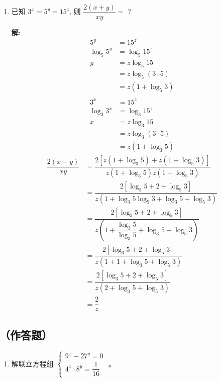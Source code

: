 \documentclass{report}
\newcommand{\sol}{\vspace{0.2cm}\textbf{解}:}
\begin{document}
\begin{multicols*}{2}
\begin{enumerate}
        \item 已知 $3^x=5^y=15^z$, 则 $\dfrac{2(x+y)}{x y}=$ ?

              \sol{}
              \begin{align*}
                  5^y        & = 15^z                 \\
                  \log_5 5^y & = \log_5 15^z          \\
                  y          & = z \log_5 15          \\
                             & = z \log_5 (3 \cdot 5) \\
                             & = z (1 + \log_5 3)     \\
              \end{align*}
              \begin{align*}
                  3^x        & = 15^z                 \\
                  \log_3 3^x & = \log_3 15^z          \\
                  x          & = z \log_3 15          \\
                             & = z \log_3 (3 \cdot 5) \\
                             & = z (1 + \log_3 5)
              \end{align*}
              \begin{align*}
                  \dfrac{2(x+y)}{xy} & = \dfrac{2\left[z(1 + \log_3 5) + z(1 + \log_5 3)\right]}{z(1 + \log_3 5)z(1 + \log_5 3)}                \\
                                     & = \dfrac{2\left[\log_3 5 + 2 + \log_5 3\right]}{z(1 + \log_3 5\log_5 3 + \log_3 5 + \log_5 3)}           \\
                                     & = \dfrac{2\left[\log_3 5 + 2 + \log_5 3\right]}{z(1 + \dfrac{\log_3 5}{\log_3 5} + \log_3 5 + \log_5 3)} \\
                                     & = \dfrac{2\left[\log_3 5 + 2 + \log_5 3\right]}{z(1 + 1 + \log_3 5 + \log_5 3)}                          \\
                                     & = \dfrac{2\left[\log_3 5 + 2 + \log_5 3\right]}{z(2 + \log_3 5 + \log_5 3)}                              \\
                                     & = \dfrac{2}{z}
              \end{align*}
    \end{enumerate}

    \subsection*{（作答题）}
    \begin{enumerate}[leftmargin=*]
        \item 解联立方程组 $\left\{\begin{array}{c}9^x-27^y=0 \\ 4^x \cdot 8^y=\dfrac{1}{16}\end{array}\right.$ 。


\end{enumerate}
\end{multicols*}
\end{document}
